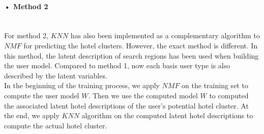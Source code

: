 \documentclass[11pt]{article} %
\begin{document}
\paragraph{• Method 2}\mbox{}\\
For method 2, $KNN$ has also been implemented as a complementary algorithm to $NMF$ for predicting the hotel clusters. However, the exact method is different. In this method, the latent description of search regions has been used when building the user model. Compared to method 1, now each basis user type is also described by the latent variables.\\
In the beginning of the training process, we apply $NMF$ on the training set to compute the user model $W$. Then we use the computed model $W$ to computed the associated latent hotel descriptions of the user's potential hotel cluster. At the end, we apply $KNN$ algorithm on the computed latent hotel descriptions to compute the actual hotel cluster.
\end{document}
